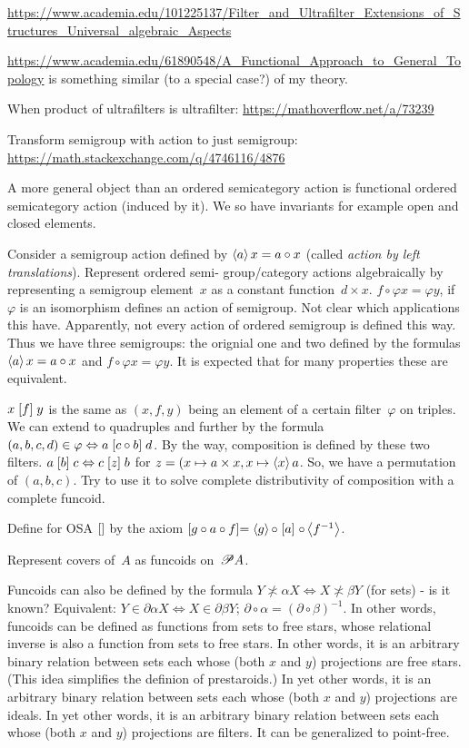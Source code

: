 \documentclass{amsart}
\begin{document}
\url{https://www.academia.edu/101225137/Filter_and_Ultrafilter_Extensions_of_Structures_Universal_algebraic_Aspects}

\url{https://www.academia.edu/61890548/A_Functional_Approach_to_General_Topology}
is something similar (to a special case?) of my theory.

When product of ultrafilters is ultrafilter:
\url{https://mathoverflow.net/a/73239}

Transform semigroup with action to just semigroup:
\url{https://math.stackexchange.com/q/4746116/4876}

A more general object than an ordered semicategory action is
functional ordered semicategory action (induced by it).
We so have invariants for example open and closed elements.

Consider a semigroup action defined by $\left\langle a\right\rangle x=a\circ x$ (called \emph{action by left translations}).
Represent ordered semi- group/category actions algebraically by representing
a semigroup element~$x$ as a constant function~$d\times x$.
$f\circ\varphi x=\varphi y$, if $\varphi$ is an isomorphism defines
an action of semigroup. Not clear which applications this have.
Apparently, not every action of ordered semigroup is defined this way.
Thus we have three semigroups: the orignial one and two defined by the formulas
$\left\langle a\right\rangle x=a\circ x$ and $f\circ\varphi x=\varphi y$. It is expected that
for many properties these are equivalent.

$x\mathrel{\left[f\right]}y$ is the same as $(x,f,y)$ being an element of a certain filter~$\varphi$
on triples. We can extend to quadruples and further by the formula
$(a,b,c,d)\in\varphi\Leftrightarrow a\mathrel{\left[c\circ b\right]}d$. By the way,
composition is defined by these two filters.
$a\mathrel{\left[b\right]}c\Leftrightarrow c\mathrel{\left[z\right]}b$ for $z=(x\mapsto a\times x,x\mapsto\left\langle x\right\rangle a$. So, we have a permutation of $(a,b,c)$. Try to use it to
solve complete distributivity of composition with a complete funcoid.

Define for OSA $\mathrel{\left[\right]}$ by the axiom $\mathrel{\left[g\circ a\circ f\right]}=\left\langle g\right\rangle\circ\mathrel{\left[a\right]}\circ\left\langle f^{-1}\right\rangle$.

Represent covers of~$A$ as funcoids on~$\mathscr{P} A$.

Funcoids can also be defined by the formula $Y\nasymp\alpha X\Leftrightarrow X\nasymp\beta Y$ (for sets) - is it known?
Equivalent: $Y\in\partial\alpha X\Leftrightarrow X\in\partial\beta Y$; $\partial\circ\alpha=(\partial\circ\beta)^{-1}$.
In other words, funcoids can be defined as functions from sets to free stars, whose relational inverse is also a function from sets to free stars.
In other words, it is an arbitrary binary relation between sets each whose (both $x$ and $y$) projections are free stars.
(This idea simplifies the definion of prestaroids.)
In yet other words, it is an arbitrary binary relation between sets each whose (both $x$ and $y$) projections are ideals.
In yet other words, it is an arbitrary binary relation between sets each whose (both $x$ and $y$) projections are filters.
It can be generalized to point-free.
\end{document}
